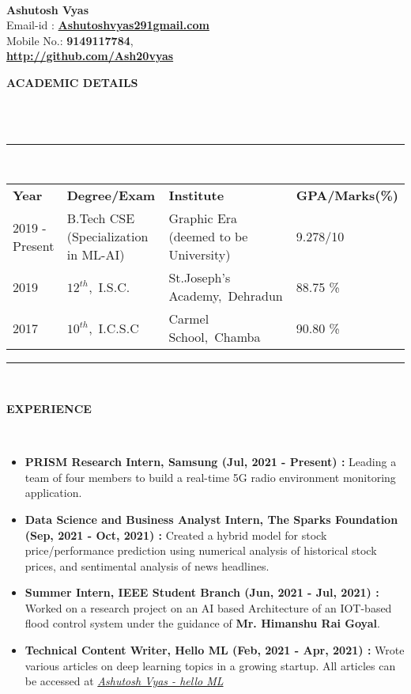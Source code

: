 \documentclass[a4paper,10pt]{article}
\newcommand{\lsep}{-0.5cm}
\newcommand{\resheading}[1]{{\small \colorbox{mygrey}{\begin{minipage}{0.975\textwidth}{\textbf{#1 \vphantom{p\^{E}}}}\end{minipage}}}}
\begin{document}
\hspace{0.5cm}\\[-0.2cm]

\textbf{Ashutosh Vyas} \\
\indent Email-id : \textbf{\url{Ashutoshvyas291gmail.com}} \\
\indent Mobile No.: \textbf{9149117784}, \ \\
\indent \textbf{\url{http://github.com/Ash20vyas}}\\

\resheading{\textbf{ACADEMIC DETAILS} }\\[\lsep]
\\
\indent \rule{6.8in}{0.4pt}\\
\indent \begin{tabular}{ l @{\hskip 0.15in} l @{\hskip 0.15in} l @{\hskip 0.15in} l @{\hskip 0.15in} }
\noindent \textbf{Year} & \textbf{Degree/Exam} & \textbf{Institute} & \textbf{GPA/Marks(\%)}\\
2019 - Present & B.Tech CSE (Specialization in ML-AI) & Graphic Era (deemed to be University) & 9.278/10 \\
2019 & $12^{th}$,\ I.S.C. & St.Joseph's Academy,\ Dehradun & 88.75 \% \\
2017 & $10^{th}$,\ I.C.S.C & Carmel School,\ Chamba & 90.80 \%\\

\end{tabular}
\indent \rule{6.8in}{0.4pt}
\\

\resheading{\textbf{EXPERIENCE} }\\[\lsep]
\begin{itemize}
\setlength\itemsep{0.5em}
\item \textbf{PRISM Research Intern, Samsung (Jul, 2021 - Present) : }Leading a team of four members to build a real-time 5G radio environment monitoring application.
\item \textbf{Data Science and Business Analyst Intern, The Sparks Foundation (Sep, 2021 - Oct, 2021) : }Created a hybrid model for stock price/performance prediction using numerical analysis of historical stock prices, and sentimental analysis of news headlines.
\item \textbf{Summer Intern, IEEE Student Branch (Jun, 2021 - Jul, 2021) : }
Worked on a research project on an AI based Architecture of an IOT-based flood control system under the guidance of \textbf{Mr. Himanshu Rai Goyal}.
\item \textbf{Technical Content Writer, Hello ML (Feb, 2021 - Apr, 2021) : }Wrote various articles on deep learning topics in a growing startup.
All articles can be accessed at \href{https://helloml.org/author/ashutosh-vyas/} {\textit{Ashutosh Vyas - hello ML}}
\end{itemize}
\end{document}

